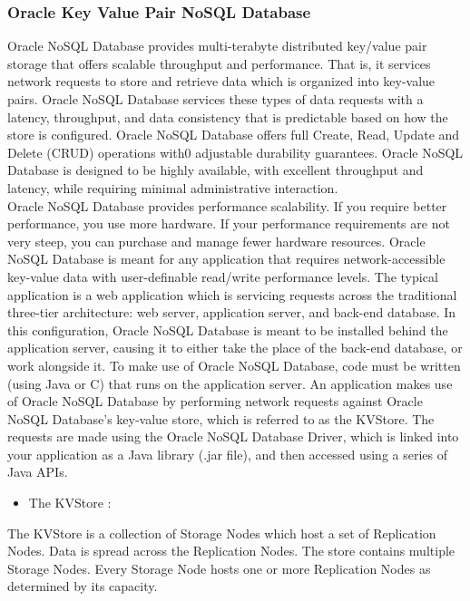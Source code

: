 \subsubsection{Oracle Key Value Pair NoSQL Database}
\hspace*{0.7in} Oracle NoSQL Database provides multi-terabyte distributed key/value pair storage that offers scalable throughput and performance. That is, it services network requests to store and retrieve data which is organized into key-value pairs. Oracle NoSQL Database services these types of data requests with a latency, throughput, and data consistency that is predictable based on how the store is configured. Oracle NoSQL Database offers full Create, Read, Update and Delete (CRUD) operations with0 adjustable durability guarantees. Oracle NoSQL Database is designed to be highly available, with excellent throughput and latency, while requiring minimal administrative interaction. \\
\hspace*{0.7in} Oracle NoSQL Database provides performance scalability. If you require better performance, you use more hardware. If your performance requirements are not very steep, you can purchase and manage fewer hardware resources. Oracle NoSQL Database is meant for any application that requires network-accessible key-value data with user-definable read/write performance levels. The typical application is a web application which is servicing requests across the traditional three-tier architecture: web server, application server, and back-end database. In this configuration, Oracle NoSQL Database is meant to be installed behind the application server, causing it to either take the place of the back-end database, or work alongside it. To make use of Oracle NoSQL Database, code must be written (using Java or C) that runs on the application server. An application makes use of Oracle NoSQL Database by performing network requests against Oracle NoSQL Database's key-value store, which is referred to as the KVStore. The requests are made using the Oracle NoSQL Database Driver, which is linked into your application as a Java library (.jar file), and then accessed using a series of Java APIs. \\
\begin{itemize}
    \item The KVStore :
\end{itemize}
\hspace*{0.7in} The KVStore is a collection of Storage Nodes which host a set of Replication Nodes. Data is spread across the Replication Nodes. The store contains multiple Storage Nodes. Every Storage Node hosts one or more Replication Nodes as determined by its capacity. \\
